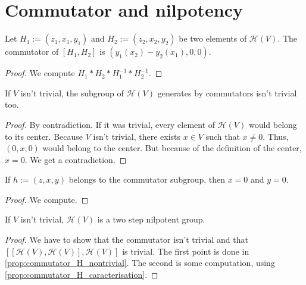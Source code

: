 \section{Commutator and nilpotency}

\begin{proposition}[Commutator]
    \label{prop:commutator_H_of_elements}
    \leanok 

    Let $H_1:=(z_1,x_1,y_1)$ and $H_2:=(z_2,x_2,y_2)$ be two elements of 
    $\mathcal{H}(V)$. The commutator of $[H_1,H_2]$ is $(y_1(x_2)-y_2(x_1),0,0)$.
\end{proposition}
\begin{proof}
    \leanok
    We compute $H_1*H_2*H_1^{-1}*H_2^{-1}$.
\end{proof}

\begin{proposition}
    \label{prop:commutator_H_nontrivial}
    \leanok 

    If $V$ isn't trivial, the subgroup of $\mathcal{H}(V)$ 
    generates by commutators isn't trivial too.
\end{proposition}
\begin{proof}
    \leanok 
    By contradiction. If it was trivial, every element of $\mathcal{H}(V)$
    would belong to its center.
    Because $V$ isn't trivial, there exists $x\in V$ such that $x\ne0$. Thus,
    $(0,x,0)$ would belong to the center. But because of the definition of the center, $x = 0$. 
    We get a contradiction.
\end{proof}

\begin{proposition}
        \label{prop:commutator_H_caracterisation}
        \leanok
    
        If $h:=(z,x,y)$ belongs to the commutator subgroup, then $x=0$ and $y=0$.
\end{proposition}
\begin{proof}
    \leanok
    We compute.
\end{proof}

\begin{theorem}
    \label{thm:two_step_nil}
    \leanok

    If $V$ isn't trivial, $\mathcal{H}(V)$ is a two step nilpotent group.
\end{theorem}
\begin{proof}
    \leanok
    We have to show that the commutator isn't trivial and that $[[\mathcal{H}(V),\mathcal{H}(V)],\mathcal{H}(V)]$
    is trivial. The first point is done in \ref{prop:commutator_H_nontrivial}.
    The second is some computation, using \ref{prop:commutator_H_caracterisation}.
\end{proof}

